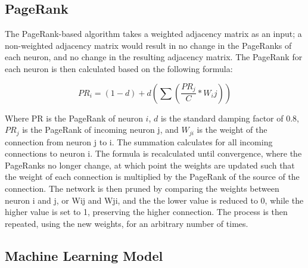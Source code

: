 \documentclass[11pt]{article}
\begin{document}
\subsection{PageRank}
The PageRank-based algorithm takes a weighted adjacency matrix as an input; a non-weighted adjacency matrix would result in no change in the PageRanks of each neuron, and no change in the resulting adjacency matrix. The PageRank for each neuron is then calculated based on the following formula:

$$PR_i = (1-d)+d(\sum(\frac{PR_j}{C} * W_ij))$$

Where PR is the PageRank of neuron $i$, $d$ is the standard damping factor of 0.8, $PR_j$ is the PageRank of incoming neuron j, and $W_{ji}$ is the weight of the connection from neuron j to i. The summation calculates for all incoming connections to neuron i. The formula is recalculated until convergence, where the PageRanks no longer change, at which point the weights are updated such that the weight of each connection is multiplied by the PageRank of the source of the connection. The network is then pruned by comparing the weights between neuron i and j, or Wij and Wji, and the the lower value is reduced to 0, while the higher value is set to 1, preserving the higher connection. The process is then repeated, using the new weights, for an arbitrary number of times.\par

\subsection{Machine Learning Model}
\end{document}
